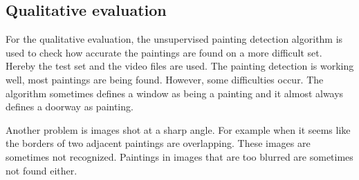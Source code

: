 \subsection{Qualitative evaluation}
For the qualitative evaluation, the unsupervised painting detection algorithm is used to check how accurate the paintings are found on a more difficult set. Hereby the test set and the video files are used. The painting detection is working well, most paintings are being found. However, some difficulties occur. The algorithm sometimes defines a window as being a painting and it almost always defines a doorway as painting.

Another problem is images shot at a sharp angle. For example when it seems like the borders of two adjacent paintings are overlapping. These images are sometimes not recognized. Paintings in images that are too blurred are sometimes not found either.

